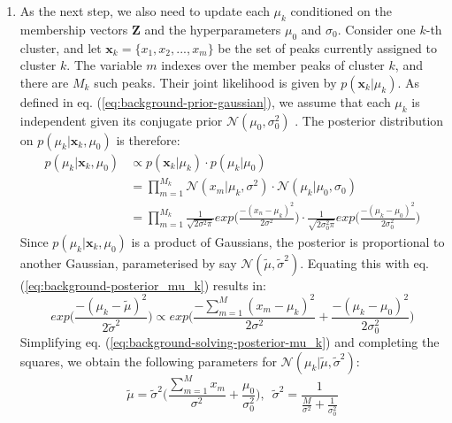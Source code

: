 \begin{enumerate}
\item As the next step, we also need to update each $\mu_k$ conditioned on the membership vectors $\boldsymbol{Z}$ and the hyperparameters $\mu_0$ and $\sigma_0$. Consider one $k$-th cluster, and let $\boldsymbol{x}_k=\{x_1, x_2, ..., x_m\}$ be the set of peaks currently assigned to cluster $k$. The variable $m$ indexes over the member peaks of cluster $k$, and there are $M_k$ such peaks. Their joint likelihood is given by $p(\boldsymbol{x}_k \vert \mu_k)$. As defined in eq. (\ref{eq:background-prior-gaussian}), we assume that each $\mu_k$ is independent given its conjugate prior $\mathcal{N}(\mu_0, \sigma_0^2)$ . The posterior distribution on $p(\mu_k \vert \boldsymbol{x}_k, \mu_0)$ is therefore:
\begin{equation}
\begin{aligned}
p(\mu_k \vert \boldsymbol{x}_k, \mu_0) &\propto p(\boldsymbol{x}_k \vert \mu_k) \cdot p(\mu_k \vert \mu_0) \\
                                                              &= \prod_{m=1}^{M_k} \mathcal{N}(x_m \vert \mu_k, \sigma^2) \cdot \mathcal{N}(\mu_k \vert \mu_0, \sigma_0) \\
                                                           &= \prod_{m=1}^{M_k} \frac{1}{\sqrt{2\sigma^2\pi}} exp\bigg(\frac{-(x_n-\mu_k)^2}{2\sigma^2} \bigg) \cdot \frac{1}{\sqrt{2\sigma_0^2\pi}} exp\bigg(\frac{-(\mu_k-\mu_0)^2}{2\sigma_0^2} \bigg)
\end{aligned}                                                           
\label{eq:background-posterior_mu_k}
\end{equation}
Since $p(\mu_k \vert \boldsymbol{x}_k, \mu_0)$ is a product of Gaussians, the posterior is proportional to another Gaussian, parameterised by say $\mathcal{N}(\tilde{\mu}, \tilde{\sigma}^2)$. Equating this with eq. (\ref{eq:background-posterior_mu_k}) results in:
\begin{equation}
exp\bigg(\frac{-(\mu_k-\tilde{\mu})^2}{2\tilde{\sigma}^2} \bigg) \propto exp\bigg(\frac{-\sum_{m=1}^{M} (x_m-\mu_k)^2}{2\sigma^2} + \frac{-(\mu_k-\mu_0)^2}{2\sigma_0^2}\bigg)
\label{eq:background-solving-posterior-mu_k}
\end{equation}
Simplifying eq. (\ref{eq:background-solving-posterior-mu_k}) and completing the squares, we obtain the following parameters for $\mathcal{N}(\mu_k \vert \tilde{\mu}, \tilde{\sigma}^2)$:
\begin{equation}
\tilde{\mu} = \tilde{\sigma}^2 \bigg( \frac{\sum_{m=1}^{M} x_m}{\sigma^2} + \frac{\mu_0}{\sigma_0^2} \bigg), \enspace
\tilde{\sigma}^2 = \frac{1}{\frac{M}{\sigma^2} + \frac{1}{\sigma^2_0}} 
\label{eq:background-tilde-mu-sigma}
\end{equation}


\end{enumerate}
